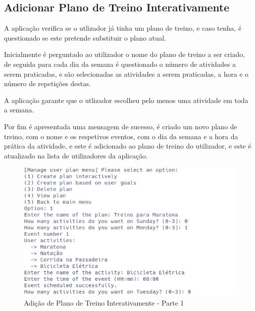 \documentclass[a4paper,12pt]{scrreprt}
\begin{document}
    \clearpage
    \subsection{Adicionar Plano de Treino Interativamente}
    A aplicação verifica se o utlizador já tinha um plano de treino, e caso tenha,
    é questionado se este pretende substituir o plano atual.

    Inicialmente é perguntado ao utilizador o nome do plano de treino a ser criado,
    de seguida para cada dia da semana é questionado o número de atividades a serem praticadas,
    e são selecionadas as atividades a serem praticadas, a hora e o número de repetições destas.

    A aplicação garante que o utlizador escolheu pelo menos uma atividade em toda a semana.

    Por fim é apresentada uma mensagem de sucesso,
    é criado um novo plano de treino, com o nome e os respetivos eventos, com o dia
    da semana e a hora da prática da atividade, e este é adicionado ao plano de treino do utilizador,
    e este é atualizado na lista de utilizadores da aplicação.

    \begin{figure}[!ht]
        \centering
        \includegraphics[width=\textwidth]{images/createPlan1.png}
        \caption{Adição de Plano de Treino Interativamente - Parte 1}
        \label{fig:add-plan-1}
    \end{figure}
\end{document}
